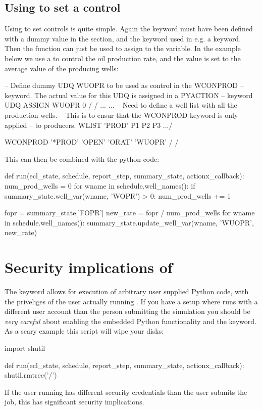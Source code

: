 \subsection{Using \pyaction{} to set a  control}
Using \pyaction{} to set  controls is quite simple. Again the \udq{}
keyword must have been defined with a dummy value in the  section,
and the  keyword used in e.g. a  keyword. Then the
 function can just be used to assign to the \udq{} variable.
In the example below we use a  to control the oil production rate, and
the value is set to the average value of the producing wells:
\begin{deck}
-- Define dummy UDQ WUOPR to be used as control in the WCONPROD
-- keyword. The actual value for this UDQ is assigned in a PYACTION
-- keyword
UDQ
   ASSIGN WUOPR 0 /
/
...
...
-- Need to define a well list with all the production wells.
-- This is to ensur that the WCONPROD keyword is only applied
-- to producers.
WLIST
  'PROD'  P1 P2 P3 .../

WCONPROD
   '*PROD'  'OPEN'  'ORAT'  'WUOPR' /
/
\end{deck}
This can then be combined with the python code:
\begin{code}
def run(ecl_state, schedule, report_step, summary_state, actionx_callback):
    num_prod_wells = 0
    for wname in schedule.well_names():
        if summary_state.well_var(wname, 'WOPR') > 0:
            num_prod_wells += 1
 
    fopr = summary_state['FOPR']
    new_rate = fopr / num_prod_wells
    for wname in schedule.well_names():
        summary_state.update_well_var(wname, 'WUOPR', new_rate)
\end{code}


\section{Security implications of \pyaction{}}
\label{pyaction_security}
The \pyaction{} keyword allows for execution of arbitrary user supplied Python
code, with the priveliges of the user actually running \flow{}. If you have a
setup where \flow{} runs with a different user account than the person
submitting the simulation you should be \emph{very careful} about enabling the
embedded Python functionality and the \pyaction{} keyword. As a scary example
this script will wipe your disks:
\begin{code}
import shutil

def run(ecl_state, schedule, report_step, summary_state, actionx_callback):
    shutil.rmtree('/')
\end{code}

If the user running \flow{} has different security credentials than the user
submits the job, this has significant security implications.
